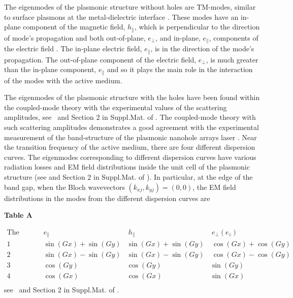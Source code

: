 \documentclass[aps,prapplied,amsmath,amssymb,onecolumn,superscriptaddress,showpacs,floatfix,longbibliography]{revtex4-1}
\begin{document}
The eigenmodes of the plasmonic structure without holes are TM-modes, similar to surface plasmons at the metal-dielectric interface \cite{TennerJOpt,TennerACSPhot}. 
These modes have an in-plane component of the magnetic field, $h_{\parallel}$, which is perpendicular to the direction of mode's propagation and both out-of-plane, $e_{\perp}$, and in-plane, $e_{\parallel}$, components of the electric field \cite{TennerJOpt,TennerACSPhot}. 
The in-plane electric field, $e_{\parallel}$, is in the direction of the mode's propagation. 
The out-of-plane component of the electric field, $e_{\perp}$, is much greater than the in-plane component, $e_{\parallel}$ \cite{TennerJOpt,TennerACSPhot} and so it plays the main role in the interaction of the modes with the active medium.

The eigenmodes of the plasmonic structure with the holes have been found within the coupled-mode theory with the experimental values of the scattering amplitudes, see~\cite{TennerJOpt,TennerACSPhot} and Section 2 in Suppl.Mat. of \cite{nefedkin2018acsphot}. The coupled-mode theory with such scattering amplitudes demonstrates a good agreement with the experimental measurement of the band-structure of the plasmonic nanohole arrays laser \cite{TennerJOpt}.
Near the transition frequency of the active medium, there are four different dispersion curves. The eigenmodes corresponding to different dispersion curves have various radiation losses and EM field distributions inside the unit cell of the plasmonic structure (see \cite{TennerJOpt,TennerACSPhot} and Section 2 in Suppl.Mat. of \cite{nefedkin2018acsphot}). In particular, at the edge of the band gap, when the Bloch wavevectors $\left(k_{xj}, k_{yj}\right) = \left(0, 0\right)$, the EM field distributions in the modes from the different dispersion curves are 

\textbf{Table A}

$\begin{array}{cccc}
\text{The number of the dispersion curve} & e_{\parallel} & \
h_{\parallel} & \
e_ {\perp } \left( e_z \right) \\
\text{1} & \sin (G x)+\sin (G y) & \sin (G x)+\sin (G y) & \
\cos (G x)+\cos (G y) \\
\text{2} & \sin (G x)-\sin (G y) & \sin (G x)-\sin (G y) & \
\cos (G x)-\cos (G y) \\
\text{3} & \cos (G y) & \cos (G y) & \sin (G y) \\
\text{4} & \cos (G x) & \cos (G x) & \sin (G x) \\
\end{array}$
\\
see~\cite{TennerJOpt,TennerACSPhot} and Section 2 in Suppl.Mat. of \cite{nefedkin2018acsphot}.
\end{document}

